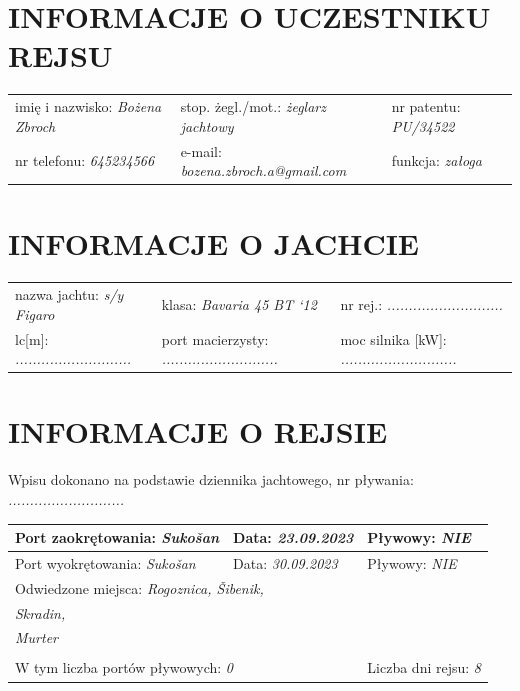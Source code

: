 \documentclass{article}
\begin{document}
\section*{INFORMACJE O UCZESTNIKU REJSU}
\begin{tabularx}{\textwidth}{X X X}
imię i nazwisko: \textit{Bożena Zbroch} & stop. żegl./mot.: \textit{żeglarz jachtowy} & nr patentu: \textit{PU/34522} \\
nr telefonu: \textit{645234566} & e-mail: \textit{bozena.zbroch.a@gmail.com} & funkcja: \textit{załoga} \\
\end{tabularx}

\section*{INFORMACJE O JACHCIE}

\begin{tabularx}{\textwidth}{X X X}
nazwa jachtu: \textit{s/y Figaro} & klasa: \textit{Bavaria 45 BT ‘12} & nr rej.: \textit{...........................} \\
lc[m]: \textit{...........................} & port macierzysty: \textit{...........................} & moc silnika [kW]: \textit{...........................} \\
\end{tabularx}

\section*{INFORMACJE O REJSIE}

Wpisu dokonano na podstawie dziennika jachtowego, nr pływania: \textit{...........................}
\\

\begin{tabularx}{\textwidth}{|X|X|X|}
\hline
Port zaokrętowania: \textit{Sukošan} & Data: \textit{23.09.2023} & Pływowy: \textit{NIE} \\
\hline
Port wyokrętowania: \textit{Sukošan} & Data: \textit{30.09.2023} & Pływowy: \textit{NIE} \\
\hline
\multicolumn{3}{|l|}{Odwiedzone miejsca:
\textit{Rogoznica, Šibenik,}\dotfill}\\
\multicolumn{3}{|l|}{\textit{ Skradin,}\dotfill} \\
\multicolumn{3}{|l|}{\textit{ Murter}\dotfill} \\
\multicolumn{3}{|l|}{\dotfill} \\
\hline
\multicolumn{2}{|l|}{W tym liczba portów pływowych: \textit{0}} & Liczba dni rejsu: \textit{8}\\
\hline
\end{tabularx}
\\\\
\end{document}

